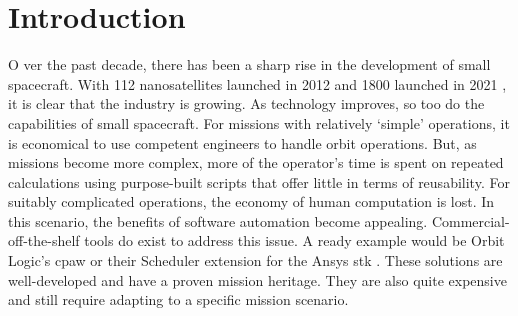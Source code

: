\glsresetall{} 
\chapter{Introduction}\label{chap:intro}



\lettrine[lines=2, findent=0pt, nindent=5pt]{O}{} ver the past decade, there
has been a sharp rise in the development of small spacecraft. With 112
nanosatellites launched in 2012 and 1800 launched in 2021
\cite{nanosats_total_2023}, it is clear that the industry is growing. As
technology improves, so too do the capabilities of small spacecraft. For
missions with relatively ‘simple’ operations, it is economical to use competent
engineers to handle orbit operations. But, as missions become more complex,
more of the operator’s time is spent on repeated calculations using
purpose-built scripts that offer little in terms of reusability. For suitably
complicated operations, the economy of human computation is lost. In this
scenario, the benefits of software automation become appealing.
Commercial-off-the-shelf tools do exist to address this issue. A ready example
would be Orbit Logic’s \gls{cpaw} \cite{orbit_logic_cpaw_2021} or their
Scheduler extension for the Ansys \gls{stk} \cite{ansys_stk_nodate}. These
solutions are well-developed and have a proven mission heritage. They are also
quite expensive and still require adapting to a specific mission scenario.   


